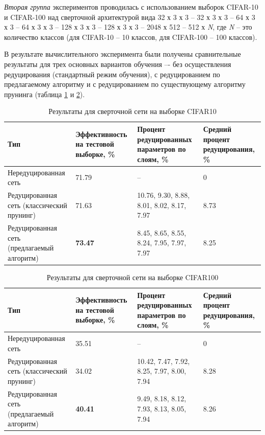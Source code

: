 \textit{Вторая группа} экспериментов проводилась с использованием выборок CIFAR-10 и CIFAR-100 над сверточной архитектурой вида 32 х 3 х 3 -- 32 х 3 х 3 -- 64 х 3 х 3 -- 64 х 3 х 3 -- 128 х 3 х 3 -- 128 х 3 х 3 -- 2048 х 512 -- 512 х \textit{N}, где \textit{N} -- это количество классов (для CIFAR-10 -- 10 классов, для CIFAR-100 -- 100 классов).

В результате вычислительного эксперимента были получены сравнительные результаты для трех основных вариантов обучения –- без осуществления редуцирования (стандартный режим обучения), с редуцированием по предлагаемому алгоритму и с редуцированием по существующему алгоритму прунинга \cite[c.~1]{wang2019pruning} (таблица \ref{table:cifar_10_conv} и \ref{table:cifar_100_conv}).

\begin{table} [!h]
  \small
  \caption{Результаты для сверточной сети на выборке CIFAR10}\label{table:cifar_10_conv}
\centering
\begin{tabular}{| p{3.5cm} | p{4cm} | p{4cm} | p{3cm} |}
  \hline
    \textbf{Тип} & \textbf{Эффективность на тестовой выборке, \%} & \textbf{Процент редуцированных параметров по слоям, \%} & \textbf{Средний процент редуцирования, \%}\\
    \hline
    Нередуцированная сеть & 71.79 & -- & 0\\
    \hline
    Редуцированная сеть (классический прунинг) & 71.63 & 10.76, 9.30, 8.88, 8.01, 8.02, 8.17, 7.97 & 8.73\\
    \hline
    Редуцированная сеть (предлагаемый алгоритм) & \textbf{73.47} & 8.45, 8.65, 8.55, 8.24, 7.95, 7.97, 7.97 & 8.25\\
    \hline
\end{tabular}
\end{table}

\begin{table} [!h]
  \small
  \caption{Результаты для сверточной сети на выборке CIFAR100}\label{table:cifar_100_conv}
\centering
\begin{tabular}{| p{3.5cm} | p{4cm} | p{4cm} | p{3cm} |}
  \hline
    \textbf{Тип} & \textbf{Эффективность на тестовой выборке, \%} & \textbf{Процент редуцированных параметров по слоям, \%} & \textbf{Средний процент редуцирования, \%}\\
    \hline
    Нередуцированная сеть & 35.51 & -- & 0\\
    \hline
    Редуцированная сеть (классический прунинг) & 34.02 & 10.42, 7.47, 7.92, 8.25, 7.97, 8.00, 7.94 & 8.28\\
    \hline
    Редуцированная сеть (предлагаемый алгоритм) & \textbf{40.41} & 9.49, 8.18, 8.12, 7.93, 8.13, 8.05, 7.94 & 8.26\\
    \hline
\end{tabular}
\end{table}

